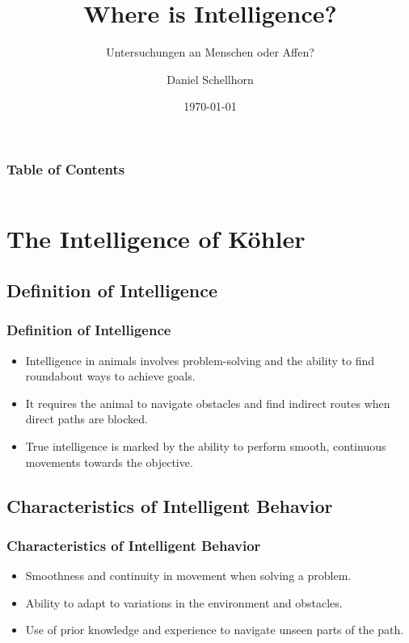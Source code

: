 \documentclass[10pt]{beamer}
\title{Where is Intelligence?}
\subtitle{Untersuchungen an Menschen oder Affen?}
\author{Daniel Schellhorn}
\institute{Uni Osnabrück}
\date{\today}
\begin{document}
\maketitle


\begin{frame}[t]
    \frametitle{Table of Contents}
    \footnotesize
    \begin{columns}
      \begin{column}{1\textwidth}
        \tableofcontents[sections={1-3}]
      \end{column}
    \end{columns}
\end{frame}

    

\section{The Intelligence of Köhler}

\begin{frame}
    \subsection{Definition of Intelligence}
    \frametitle{Definition of Intelligence}
    \begin{itemize}
        \item Intelligence in animals involves problem-solving and the ability to find roundabout ways to achieve goals.
        \item It requires the animal to navigate obstacles and find indirect routes when direct paths are blocked.
        \item True intelligence is marked by the ability to perform smooth, continuous movements towards the objective.
    \end{itemize}
    \end{frame}
    
    \subsection{Characteristics of Intelligent Behavior}
    \begin{frame}
    \frametitle{Characteristics of Intelligent Behavior}
    \begin{itemize}
        \item Smoothness and continuity in movement when solving a problem.
        \item Ability to adapt to variations in the environment and obstacles.
        \item Use of prior knowledge and experience to navigate unseen parts of the path.
    \end{itemize}
    \end{frame}
    
\end{document}
